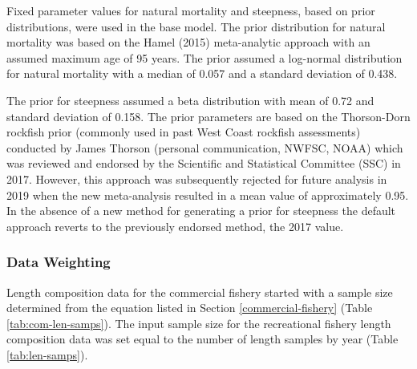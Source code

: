 \documentclass[11pt,
  english,
  a4paper,
]{article}
\begin{document}
\leavevmode\tagmcend\tagstructend


Fixed parameter values for natural mortality and steepness, based on prior distributions, were used in the base model. The prior distribution for natural mortality was based on the Hamel {(2015)\leavevmode\tagmcend\tagstructend} meta-analytic approach with an assumed maximum age of 95 years. The prior assumed a log-normal distribution for natural mortality with a median of 0.057 and a standard deviation of 0.438.

\leavevmode\tagmcend\tagstructend\par


The prior for steepness assumed a beta distribution with mean of 0.72 and standard deviation of 0.158. The prior parameters are based on the Thorson-Dorn rockfish prior (commonly used in past West Coast rockfish assessments) conducted by James Thorson (personal communication, NWFSC, NOAA) which was reviewed and endorsed by the Scientific and Statistical Committee (SSC) in 2017. However, this approach was subsequently rejected for future analysis in 2019 when the new meta-analysis resulted in a mean value of approximately 0.95. In the absence of a new method for generating a prior for steepness the default approach reverts to the previously endorsed method, the 2017 value.

\leavevmode\tagmcend\tagstructend\par


\hypertarget{data-weighting}{%
\subsubsection{Data Weighting}\label{data-weighting}}

\leavevmode\tagmcend\tagstructend


Length composition data for the commercial fishery started with a sample size determined from the equation listed in Section \ref{commercial-fishery} (Table \ref{tab:com-len-samps}). The input sample size for the recreational fishery length composition data was set equal to the number of length samples by year (Table \ref{tab:len-samps}).
\end{document}
